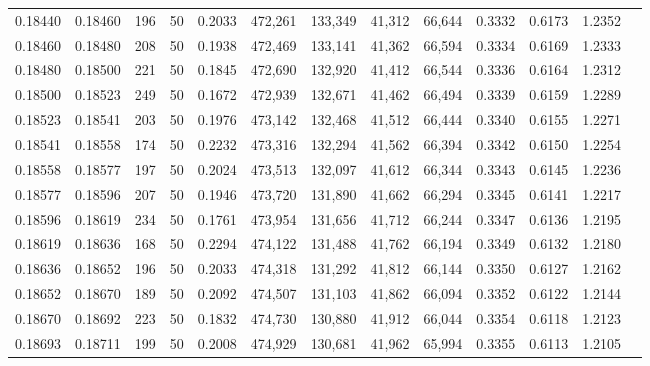 \begin{tabular}{rrrrrrrrrrrrr}
0.18440 & 0.18460 &   196 &  50 &                                     0.2033 & 472,261 & 133,349 &  41,312 &  66,644 & 0.3332 & 0.6173 & 1.2352 \\
0.18460 & 0.18480 &   208 &  50 &                                     0.1938 & 472,469 & 133,141 &  41,362 &  66,594 & 0.3334 & 0.6169 & 1.2333 \\
0.18480 & 0.18500 &   221 &  50 &                                     0.1845 & 472,690 & 132,920 &  41,412 &  66,544 & 0.3336 & 0.6164 & 1.2312 \\
0.18500 & 0.18523 &   249 &  50 &                                     0.1672 & 472,939 & 132,671 &  41,462 &  66,494 & 0.3339 & 0.6159 & 1.2289 \\
0.18523 & 0.18541 &   203 &  50 &                                     0.1976 & 473,142 & 132,468 &  41,512 &  66,444 & 0.3340 & 0.6155 & 1.2271 \\
0.18541 & 0.18558 &   174 &  50 &                                     0.2232 & 473,316 & 132,294 &  41,562 &  66,394 & 0.3342 & 0.6150 & 1.2254 \\
0.18558 & 0.18577 &   197 &  50 &                                     0.2024 & 473,513 & 132,097 &  41,612 &  66,344 & 0.3343 & 0.6145 & 1.2236 \\
0.18577 & 0.18596 &   207 &  50 &                                     0.1946 & 473,720 & 131,890 &  41,662 &  66,294 & 0.3345 & 0.6141 & 1.2217 \\
0.18596 & 0.18619 &   234 &  50 &                                     0.1761 & 473,954 & 131,656 &  41,712 &  66,244 & 0.3347 & 0.6136 & 1.2195 \\
0.18619 & 0.18636 &   168 &  50 &                                     0.2294 & 474,122 & 131,488 &  41,762 &  66,194 & 0.3349 & 0.6132 & 1.2180 \\
0.18636 & 0.18652 &   196 &  50 &                                     0.2033 & 474,318 & 131,292 &  41,812 &  66,144 & 0.3350 & 0.6127 & 1.2162 \\
0.18652 & 0.18670 &   189 &  50 &                                     0.2092 & 474,507 & 131,103 &  41,862 &  66,094 & 0.3352 & 0.6122 & 1.2144 \\
0.18670 & 0.18692 &   223 &  50 &                                     0.1832 & 474,730 & 130,880 &  41,912 &  66,044 & 0.3354 & 0.6118 & 1.2123 \\
0.18693 & 0.18711 &   199 &  50 &                                     0.2008 & 474,929 & 130,681 &  41,962 &  65,994 & 0.3355 & 0.6113 & 1.2105 \\

\end{tabular}
